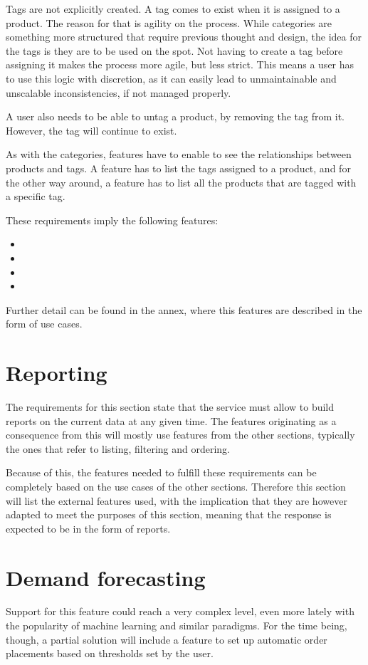 Tags are not explicitly created. A tag comes to exist when it is assigned to a product. The reason for that is agility on the process. While categories are something more structured that require previous thought and design, the idea for the tags is they are to be used on the spot. Not having to create a tag before assigning it makes the process more agile, but less strict. This means a user has to use this logic with discretion, as it can easily lead to unmaintainable and unscalable inconsistencies, if not managed properly.

A user also needs to be able to untag a product, by removing the tag from it. However, the tag will continue to exist.

As with the categories, features have to enable to see the relationships between products and tags. A feature has to list the tags assigned to a product, and for the other way around, a feature has to list all the products that are tagged with a specific tag.

These requirements imply the following features:
\hfill\break
\begin{itemize}
\item {}
\item {}
\item {}
\item {}
\end{itemize}
\hfill\break
Further detail can be found in the annex, where this features are described in the form of use cases.

\section{Reporting}
The requirements for this section state that the service must allow to build reports on the current data at any given time. The features originating as a consequence from this will mostly use features from the other sections, typically the ones that refer to listing, filtering and ordering.

Because of this, the features needed to fulfill these requirements can be completely based on the use cases of the other sections. Therefore this section will list the external features used, with the implication that they are however adapted to meet the purposes of this section, meaning that the response is expected to be in the form of reports.

\section{Demand forecasting}
Support for this feature could reach a very complex level, even more lately with the popularity of machine learning and similar paradigms. For the time being, though, a partial solution will include a feature to set up automatic order placements based on thresholds set by the user.


